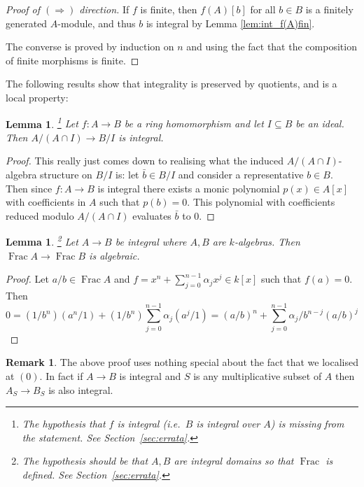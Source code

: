 \documentclass[12pt]{article}
\theoremstyle{plain}
\newtheorem{lemma}[thm]{Lemma}
\theoremstyle{definition}
\newtheorem{remark}[thm]{Remark}
\newcommand{\lto}{\longrightarrow}
\begin{document}
\begin{proof}[Proof of $(\Rightarrow)$ direction]
If $f$ is finite, then $f(A)[b]$ for all $b \in B$ is a finitely generated $A$-module, and thus $b$ is integral by Lemma \ref{lem:int_f(A)fin}.

The converse is proved by induction on $n$ and using the fact that the composition of finite morphisms is finite.
\end{proof}
The following results show that integrality is preserved by quotients, and is a local property:
\begin{lemma}
\label{lem:quotient_integrality}\footnote{The hypothesis that $f$ is integral (i.e.\ $B$ is integral over $A$) is missing from the statement. See Section~\ref{sec:errata}.}
Let $f: A \lto B$ be a ring homomorphism and let $I \subseteq B$ be an ideal. Then $A/(A \cap I) \lto B/I$ is integral.
\end{lemma}
\begin{proof}
This really just comes down to realising what the induced $A/(A \cap I)$-algebra structure on $B/I$ is: let $\bar{b} \in B/I$ and consider a representative $b \in B$. Then since $f:A \lto B$ is integral there exists a monic polynomial $p(x) \in A[x]$ with coefficients in $A$ such that $p(b) = 0$. This polynomial with coefficients reduced modulo $A/(A \cap I)$ evaluates $\bar{b}$ to 0.
\end{proof}
\begin{lemma}
\label{lem:int_implies_alg}\footnote{The hypothesis should be that $A,B$ are integral domains so that $\operatorname{Frac}$ is defined. See Section~\ref{sec:errata}.} Let $A \lto B$ be integral where $A,B$ are $k$-algebras. Then $\operatorname{Frac}A \lto \operatorname{Frac}B$ is algebraic.
\end{lemma}
\begin{proof}
Let $a/b \in \operatorname{Frac}A$ and $f = x^n + \sum_{j = 0}^{n-1}\alpha_j x^j \in k[x]$ such that $f(a) = 0$. Then
\[0 = (1/b^n)(a^n/1) + (1/b^n)\sum_{j = 0}^{n-1}\alpha_j(a^j/1) = (a/b)^n + \sum_{j = 0}^{n-1}\alpha_j/b^{n-j} (a/b)^j\]
\end{proof}
\begin{remark}
The above proof uses nothing special about the fact that we localised at $(0)$. In fact if $A \lto B$ is integral and $S$ is any multiplicative subset of $A$ then $A_S \lto B_S$ is also integral.
\end{remark}
%
\end{document}
